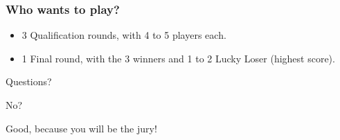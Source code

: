 \documentclass{beamer}
\begin{document}
	
	
	\begin{frame}
		\frametitle{Who wants to play?}
		\begin{itemize}
		\item 3 Qualification rounds, with 4 to 5 players each.
		\item 1 Final round, with the 3 winners and 1 to 2 Lucky Loser (highest score).
		\end{itemize}
	\end{frame}
	
	\begin{frame}
		\begin{center}
		Questions?
		
		No? 
		
		Good, because you will be the jury!
		\end{center}
	\end{frame}

	
	
	
	
	
\end{document}
